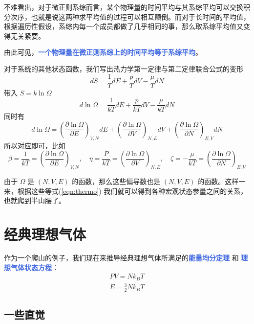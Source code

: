 不难看出，对于微正则系综而言，某个物理量的时间平均与其系综平均可以交换积分次序，也就是说这两种求平均值的过程可以相互颠倒。而对于长时间的平均值，根据遍历性假设，系综内每一个成员都做了几乎相同的事，那么取系综平均值又变得无关紧要。

由此可见，\textcolor{RoyalBlue}{\textbf{\kaishu 一个物理量在微正则系综上的时间平均等于系综平均}}。

对于系统的其他状态函数，我们写出热力学第一定律与第二定律联合公式的变形
\[
    dS = \frac{1}{T} dE + \frac{p}{T} dV - \frac{\mu}{T} dN
\]
带入 $S = k \ln \Omega$ 
\begin{equation}
    d\ln \Omega = \frac{1}{kT} dE + \frac{p}{kT} dV - \frac{\mu}{kT} dN
\end{equation}
同时有
\begin{equation}
    d\ln \Omega = \left(\frac{\partial \ln \Omega}{\partial E}\right)_{V,N} dE + \left(\frac{\partial \ln \Omega}{\partial V}\right)_{N,E} dV + \left(\frac{\partial \ln \Omega}{\partial N}\right)_{E,V} dN
\end{equation}
所以对应即可，比如
\begin{equation}\label{eqn:thermo}
    \beta = \frac{1}{kT} =  \left(\frac{\partial \ln \Omega}{\partial E}\right)_{V,N},\quad \eta  = \frac{P}{kT}  = \left(\frac{\partial \ln \Omega}{\partial V}\right)_{N,E},\quad \zeta = -\frac{\mu}{kT}  = \left(\frac{\partial \ln \Omega}{\partial N}\right)_{E,V}
\end{equation}

由于 $\Omega$ 是 $(N,V,E)$ 的函数，那么这些偏导数也是 $(N,V,E)$ 的函数。这样一来，根据这些等式(\ref*{eqn:thermo}) 我们就可以得到各种宏观状态参量之间的关系，也就爬到半山腰了。



\section{经典理想气体}\label{sec:经典理想气体}

作为一个爬山的例子，我们现在来推导经典理想气体所满足的\textcolor{RoyalBlue}{\textbf{\kaishu 能量均分定理}} 和 \textcolor{RoyalBlue}{\textbf{\kaishu 理想气体状态方程}}：
\begin{align*}
    PV = Nk_BT \\
    E = \frac{3}{2}N k_B T
\end{align*}

\subsection{一些直觉}\label{intuition}

